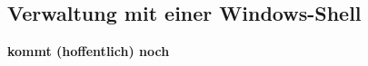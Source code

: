 \documentclass[12pt,a4paper,notitlepage,onecolumn,portrait,oneside, , , ]{scrartcl}
\begin{document}
\subsection{Verwaltung mit einer Windows-Shell}
\textbf{kommt (hoffentlich) noch}



\end{document}
